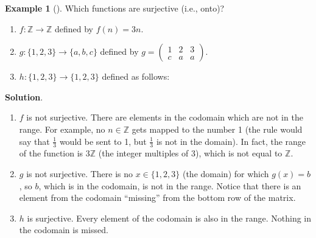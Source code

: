 \documentclass[10pt,]{book}
\theoremstyle{plain}
\theoremstyle{definition}
\theoremstyle{definition}
\newtheorem{example}[theorem]{Example}
\theoremstyle{definition}
\theoremstyle{definition}
\numberwithin{equation}{chapter}
\def\Z{\mathbb Z}
\newcommand{\amp}{&}
\begin{document}
\begin{example}[]\label{example-50}
\hypertarget{p-1741}{}%
Which functions are surjective (i.e., onto)?%
\par
\hypertarget{p-1742}{}%
\leavevmode%
\begin{enumerate}
\item\hypertarget{li-537}{}\(f:\Z \to \Z\) defined by \(f(n) = 3n\).%
\item\hypertarget{li-538}{}\(g: \{1,2,3\} \to \{a,b,c\}\) defined by \(g = \begin{pmatrix}1 \amp 2 \amp 3 \\ c \amp a \amp a \end{pmatrix}\).%
\item\hypertarget{li-539}{}\hypertarget{p-1743}{}%
\(h:\{1,2,3\} \to \{1,2,3\}\) defined as follows:%
\begin{sidebyside}{1}{0.4}{0.4}{0}
\begin{sbspanel}{0.2}
\end{sbspanel}
\end{sidebyside}
\end{enumerate}
%
\par\smallskip%
\noindent\textbf{Solution}.\hypertarget{solution-145}{}\quad%
\hypertarget{p-1744}{}%
\leavevmode%
\begin{enumerate}
\item\hypertarget{li-540}{}\(f\) is not surjective. There are elements in the codomain which are not in the range. For example, no \(n \in \Z\) gets mapped to the number 1 (the rule would say that \(\frac{1}{3}\) would be sent to 1, but \(\frac{1}{3}\) is not in the domain). In fact, the range of the function is \(3\Z\) (the integer multiples of 3), which is not equal to \(\Z\).%
\item\hypertarget{li-541}{}\(g\) is not surjective. There is no \(x \in \{1,2,3\}\) (the domain) for which \(g(x) = b\), so \(b\), which is in the codomain, is not in the range. Notice that there is an element from the codomain ``missing'' from the bottom row of the matrix.%
\item\hypertarget{li-542}{}\(h\) is surjective. Every element of the codomain is also in the range. Nothing in the codomain is missed.%
\end{enumerate}
%
\end{example}
\end{document}
